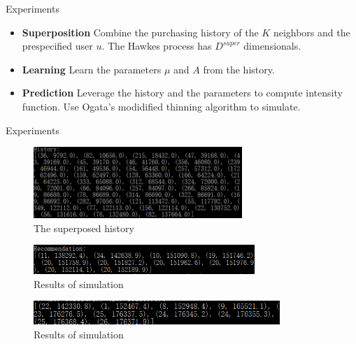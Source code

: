 \documentclass{beamer}
\begin{document}
\begin{frame}{Experiments}

\begin{itemize}
    \item \textbf{Superposition}  Combine the purchasing history of the $K$ neighbors and the prespecified user $u$. The Hawkes process has $D^{super}$ dimensionals.
    \item \textbf{Learning} Learn the parameters $\mu$ and $A$ from the history.
    \item \textbf{Prediction} Leverage the history and the parameters to compute intensity function. Use Ogata's modidified thinning algorithm to simulate.

    
\end{itemize}
    
    
\end{frame}











\begin{frame}{Experiments}


\begin{figure}
\includegraphics[height=2.7cm]{figure1.png}
\caption{The superposed history}
\end{figure}

\begin{figure}
\includegraphics[height=1.1cm]{figure2.png}
\caption{Results of simulation}
\end{figure}

\begin{figure}
\includegraphics[height=0.9cm]{figure3.png}
\caption{Results of simulation}
\end{figure}


\end{frame}
\end{document}
